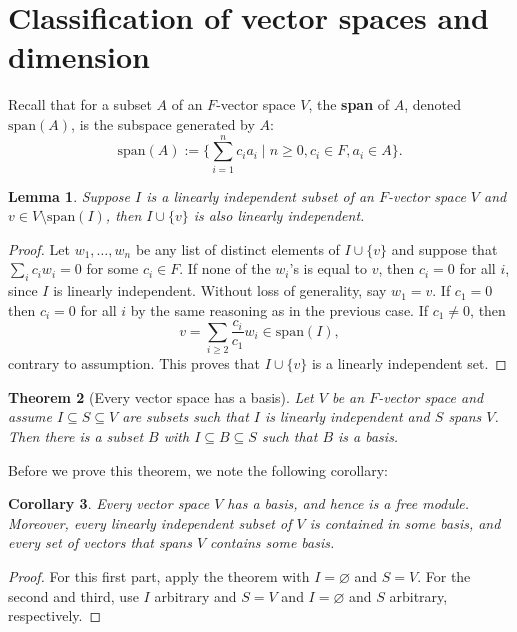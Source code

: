 \documentclass[12pt]{report}
\newtheorem{theorem}{Theorem}[chapter]
\newtheorem{lemma}[theorem]{Lemma}
\newtheorem{corollary}[theorem]{Corollary}
\numberwithin{equation}{section}
\numberwithin{theorem}{chapter}
\theoremstyle{definition}
\newtheorem*{basic properties}{Basic Properties}
\newtheorem*{Important Remark}{Important Remark}
\newcommand{\df}[1]{{\bf #1}\index{#1}}
\begin{document}
\section{Classification of vector spaces and dimension}


Recall that for a subset $A$ of an $F$-vector space $V$, the \df{span} of $A$, denoted $\mathrm{span}(A)$, is the subspace generated by $A$:
$$\mathrm{span}(A) := \{\sum_{i=1}^n c_ia_i \mid n \geqslant 0, c_i\in F, a_i \in A \}.$$



\begin{lemma}\label{lem1116}
Suppose $I$ is a linearly independent subset of an $F$-vector space $V$ and $v \in V \setminus \mathrm{span}(I)$, then $I \cup \{v\}$ is also linearly independent.
\end{lemma}

\begin{proof} 
Let $w_1, \dots, w_n$ be any list of distinct elements  of $I \cup \{v\}$ and suppose that $\sum_i c_i w_i = 0$ for some $c_i \in F$. 
If none of the $w_i$'s is equal to $v$, then $c_i = 0$ for all $i$, since $I$ is linearly independent. Without loss of generality, say $w_1 = v$. If $c_1 = 0$ then $c_i = 0$ for all $i$ by the same reasoning as in the previous case. If $c_1 \ne 0$, then 
$$v = \sum_{i \geqslant 2} \frac{c_i}{c_1} w_i \in \mathrm{span}(I),$$ 
contrary to assumption. This proves that $I \cup \{v\}$ is a linearly independent set.
\end{proof}


\begin{theorem}[Every vector space has a basis]\label{basisexist}
 Let $V$ be an $F$-vector space and assume $I \subseteq S \subseteq V$ are subsets such that $I$ is linearly independent and $S$ spans $V$. Then there is a subset $B$ with $I \subseteq B \subseteq S$ such that $B$ is a basis.
\end{theorem}

Before we prove this theorem, we note the following corollary:

\begin{corollary}\label{every vector space has a basis}
Every vector space $V$ has a basis, and hence is a free module. Moreover, every linearly independent subset of $V$ is contained in some basis, and every set of vectors that spans $V$ contains some basis. 
\end{corollary}

\begin{proof} 
For this first part, apply the theorem with $I = \varnothing$ and $S = V$. For the second and third, use $I$ arbitrary and $S = V$ and $I = \varnothing$ and $S$ arbitrary, respectively. 
\end{proof}
\end{document}
